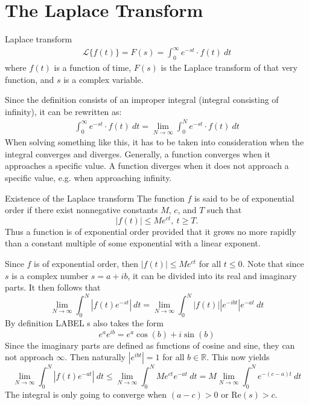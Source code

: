 \section{The Laplace Transform}
\begin{definition}{Laplace transform}{}
\begin{align}
\mathcal{L}\{f(t)\}=F(s)=\int_{0}^{\infty} e^{-st}\cdot f(t)\ dt
\label{lpdef}
\end{align}
where $f(t)$ is a function of time, $F(s)$ is the Laplace transform of that very function, and $s$ is a complex variable.
\end{definition}
Since the definition consists of an improper integral (integral consisting of infinity), it can be rewritten as:
\begin{align}
\int_{0}^{\infty} e^{-st}\cdot f(t)\ dt = \lim_{N \to \infty} \int_{0}^{N} e^{-st}\cdot f(t)\ dt
\end{align}
When solving something like this, it has to be taken into consideration when the integral converges and diverges. Generally, a function converges when it approaches a specific value. A function diverges when it does not approach a specific value, e.g. when approaching infinity.

\begin{theorem}{Existence of the Laplace transform}{}
The function $f$ is said to be of exponential order if there exist nonnegative constants $M$, $c$, and $T$  such that $$|f(t)| \leq Me^{ct}, \ t \geq T.$$
Thus a function is of exponential order provided that it grows no more rapidly than a constant multiple of some exponential with a linear exponent. \cite[p. 320]{diffandcomplex}
\end{theorem}
\begin{prof}{}{}
Since $f$ is of exponential order, then $|f(t)| \leq Me^{ct}$ for all $t \leq 0$. Note that since $s$ is a complex number  $s=a+ib$, it can be divided into its real and imaginary parts. It then follows that $$\lim_{N \to \infty} \int_{0}^{N} |f(t)e^{-st}|\ dt = \lim_{N \to \infty} \int_{0}^{N} |f(t)| |e^{-ibt}|e^{-at}\ dt$$
By definition LABEL s also takes the form $$e^{a}e^{ib}= e^{a}\cos(b)+i\sin(b)$$
Since the imaginary parts are defined as functions of cosine and sine, they can not approach $\infty$. Then naturally $|e^{ibt}|=1$ for all $b \in \mathbb{R}$. This now yields $$\lim_{N \to \infty} \int_{0}^{N} |f(t)e^{-at}|\ dt \leq \lim_{N \to \infty} \int_{0}^{N} Me^{ct}e^{-at}\ dt = M \lim_{N \to \infty} \int_{0}^{N}e^{-(c-a)t}\ dt $$ The integral is only going to converge when $(a-c)>0$ or Re$(s)>c$.
\end{prof}

